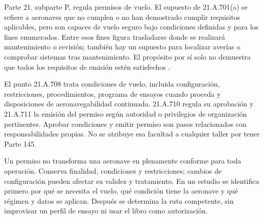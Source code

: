 Parte 21, subparte P, regula permisos de vuelo. El supuesto de 21.A.701(a) se refiere a aeronaves que no cumplen o no han demostrado cumplir requisitos aplicables, pero son capaces de vuelo seguro bajo condiciones definidas y para los fines enumerados. Entre esos fines figura trasladarse donde se realizará mantenimiento o revisión; también hay un supuesto para localizar averías o comprobar sistemas tras mantenimiento. El propósito por sí solo no demuestra que todos los requisitos de emisión estén satisfechos \cite{EU748}.

El punto 21.A.708 trata condiciones de vuelo, incluida configuración, restricciones, procedimientos, programa de ensayos cuando proceda y disposiciones de aeronavegabilidad continuada. 21.A.710 regula su aprobación y 21.A.711 la emisión del permiso según autoridad o privilegios de organización pertinentes. Aprobar condiciones y emitir permiso son pasos relacionados con responsabilidades propias. No se atribuye esa facultad a cualquier taller por tener Parte 145.

Un permiso no transforma una aeronave en plenamente conforme para toda operación. Conserva finalidad, condiciones y restricciones; cambios de configuración pueden afectar su validez y tratamiento. En un estudio se identifica primero por qué se necesita el vuelo, qué condición tiene la aeronave y qué régimen y datos se aplican. Después se determina la ruta competente, sin improvisar un perfil de ensayo ni usar el libro como autorización.

